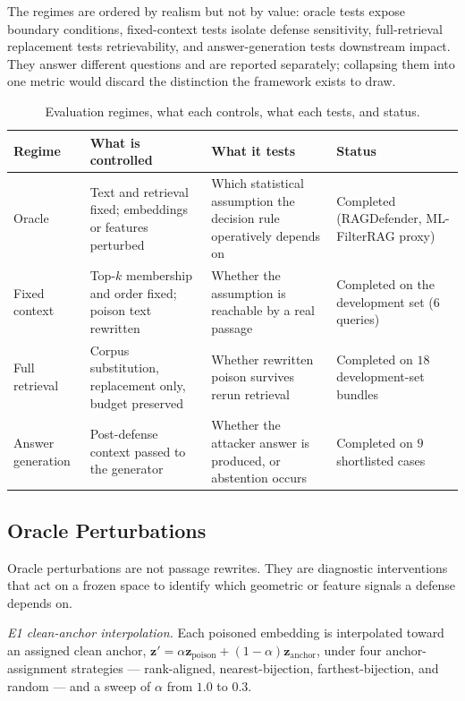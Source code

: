 \documentclass[conference]{IEEEtran}
\newcommand{\NdevQ}{6}           %
\newcommand{\NdevBundles}{18}    %
\newcommand{\NrrkwCases}{9}      %
\begin{document}
The regimes are ordered by realism but not by value: oracle tests expose boundary
conditions, fixed-context tests isolate defense sensitivity, full-retrieval
replacement tests retrievability, and answer-generation tests downstream impact.
They answer different questions and are reported separately; collapsing them into
one metric would discard the distinction the framework exists to draw.

\begin{table}[!t]
\centering
\caption{Evaluation regimes, what each controls, what each tests, and status.}
\label{tab:evaluation_levels}
\scriptsize
\setlength{\tabcolsep}{3pt}
\renewcommand{\arraystretch}{1.05}
\begin{tabular}{@{}p{}p{}p{}p{}@{}}
\toprule
Regime & What is controlled & What it tests & Status \\
\midrule
Oracle
  & Text and retrieval fixed; embeddings or features perturbed
  & Which statistical assumption the decision rule operatively depends on
  & Completed (RAGDefender, ML-FilterRAG proxy) \\
\addlinespace[2pt]
Fixed context
  & Top-$k$ membership and order fixed; poison text rewritten
  & Whether the assumption is reachable by a real passage
  & Completed on the development set ($\NdevQ$ queries) \\
\addlinespace[2pt]
Full retrieval
  & Corpus substitution, replacement only, budget preserved
  & Whether rewritten poison survives rerun retrieval
  & Completed on $\NdevBundles$ development-set bundles \\
\addlinespace[2pt]
Answer generation
  & Post-defense context passed to the generator
  & Whether the attacker answer is produced, or abstention occurs
  & Completed on $\NrrkwCases$ shortlisted cases \\
\bottomrule
\end{tabular}
\end{table}

\subsection{Oracle Perturbations}
\label{subsec:oracle}
Oracle perturbations are not passage rewrites. They are diagnostic interventions
that act on a frozen space to identify which geometric or feature signals a
defense depends on.

\textit{E1 clean-anchor interpolation.} Each poisoned embedding is interpolated
toward an assigned clean anchor,
$\mathbf{z}' = \alpha \mathbf{z}_{\mathrm{poison}} + (1-\alpha)\mathbf{z}_{\mathrm{anchor}}$,
under four anchor-assignment strategies --- rank-aligned, nearest-bijection,
farthest-bijection, and random --- and a sweep of $\alpha$ from $1.0$ to $0.3$.
\end{document}
